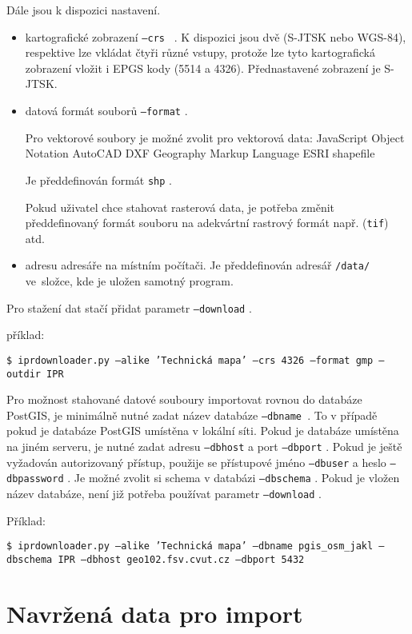 Dále jsou k dispozici nastavení.
\begin{itemize}
    \item kartografické zobrazení {\tt ---crs } . K dispozici jsou dvě
     (S-JTSK nebo WGS-84), respektive lze vkládat čtyři různé vstupy, protože 
     lze tyto kartografická zobrazení vložit i EPGS kody (5514 a 4326). 
     Přednastavené zobrazení je S-JTSK.
    \item datová formát souborů {\tt ---format} .
    
    Pro vektorové soubory je možné zvolit pro vektorová data:
          JavaScript Object Notation
          AutoCAD DXF
          Geography Markup Language
          ESRI shapefile
        
    Je předdefinován formát {\tt shp} .
         
    Pokud uživatel chce stahovat rasterová data, je potřeba změnit předdefinovaný
    formát souboru na adekvártní rastrový formát např. ({\tt tif}) atd.
    
    \item adresu adresáře na místním počítači. Je předdefinován adresář 
    {\tt /data/} ve~složce, kde je uložen samotný program.     
\end{itemize}

Pro stažení dat stačí přidat parametr {\tt ---download} .

příklad:

{\tt \$ iprdownloader.py ---alike 'Technická mapa' ---crs 4326 ---format gmp ---outdir IPR}

Pro možnost stahované datové souboury importovat rovnou do databáze PostGIS, je 
minimálně nutné zadat název databáze {\tt ---dbname }. To v případě pokud je
databáze PostGIS umístěna v lokální síti. Pokud je databáze umístěna na jiném
serveru, je nutné zadat adresu {\tt ---dbhost} a port {\tt ---dbport} . Pokud je
ještě vyžadován autorizovaný přístup, použije se přístupové jméno {\tt ---dbuser} a
heslo {\tt ---dbpassword} . Je možné zvolit si schema v databázi {\tt ---dbschema} . 
Pokud je vložen název databáze, není již potřeba používat parametr {\tt ---download} .

Příklad:

{\tt \$ iprdownloader.py ---alike 'Technická mapa' ---dbname pgis\_osm\_jakl ---dbschema IPR ---dbhost geo102.fsv.cvut.cz  ---dbport 5432 } 
 

\section{Navržená data pro import}
\label{Navržená data pro import}

